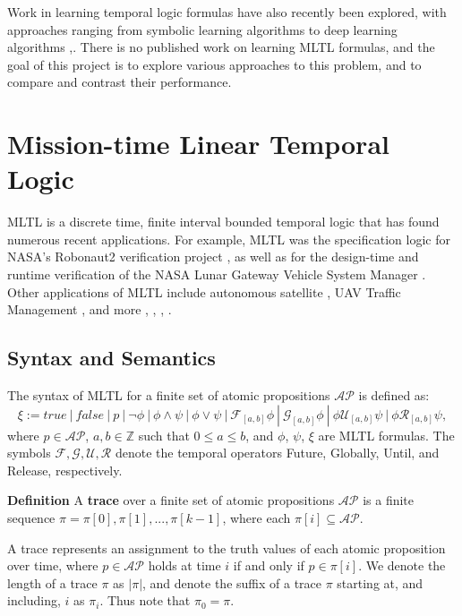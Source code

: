 \documentclass[letterpaper]{article} %
\begin{document}
Work in learning temporal logic formulas have also recently been explored, with approaches ranging from symbolic learning algorithms \cite{roy_ltlf_learning} \cite{camacho_ltlf_learning} to deep learning algorithms \cite{stl_learning},\cite{Luo_Liang_Du_Wan_Peng_Zhang_2022}.
There is no published work on learning MLTL formulas, and the goal of this project is to explore various approaches to this problem, and to compare and contrast their performance.


\section{Mission-time Linear Temporal Logic}
\label{sec:mltl}

MLTL is a discrete time, finite interval bounded temporal logic that has found numerous recent applications. 
For example, MLTL was the specification logic for NASA's Robonaut2 verification project \cite{KZJZR20}, as well as for the design-time and runtime verification of the NASA Lunar Gateway Vehicle System Manager \cite{DBR21}.
Other applications of MLTL include autonomous satellite \cite{JAXA}, UAV Traffic Management \cite{HCHJR21}, and more \cite{HLR21}, \cite{LLR21}, \cite{LJBHCLR22}, \cite{AJR22}. 

\subsection{Syntax and Semantics}
The syntax of MLTL for a finite set of atomic propositions $\mathcal{AP}$ is defined as: 
$$ 
\xi := 
true \ | 
\ false \ | 
\ p \ | 
\ \neg \phi \ | 
\ \phi \land \psi \ | 
\ \phi \lor \psi \ | 
\ \mathcal{F}_{[a,b]} \phi \ | 
\ \mathcal{G}_{[a,b]} \phi \ | 
\ \phi \mathcal{U}_{[a,b]} \psi \ | 
\ \phi \mathcal{R}_{[a,b]} \psi, 
$$
where $p \in \mathcal{AP}$, $a, b \in \mathbb{Z}$ such that $0 \leq a \leq b$, and $\phi$, $\psi$, $\xi$ are MLTL formulas. 
The symbols $\mathcal{F},\mathcal{G},\mathcal{U},\mathcal{R}$ denote the temporal operators Future, Globally, Until, and Release, respectively.

\textbf{Definition}
    A \textbf{trace} over a finite set of atomic propositions $\mathcal{AP}$ is a finite sequence $\pi = \pi[0], \pi[1], ..., \pi[k-1]$, where each $\pi[i] \subseteq \mathcal{AP}$. 

A trace represents an assignment to the truth values of each atomic proposition over time, where $p \in \mathcal{AP}$ holds at time $i$ if and only if $p \in \pi[i]$. 
We denote the length of a trace $\pi$ as $|\pi|$, and denote the suffix of a trace $\pi$ starting at, and including, $i$ as $\pi_i$.
Thus note that $\pi_0 = \pi$. 
\end{document}
